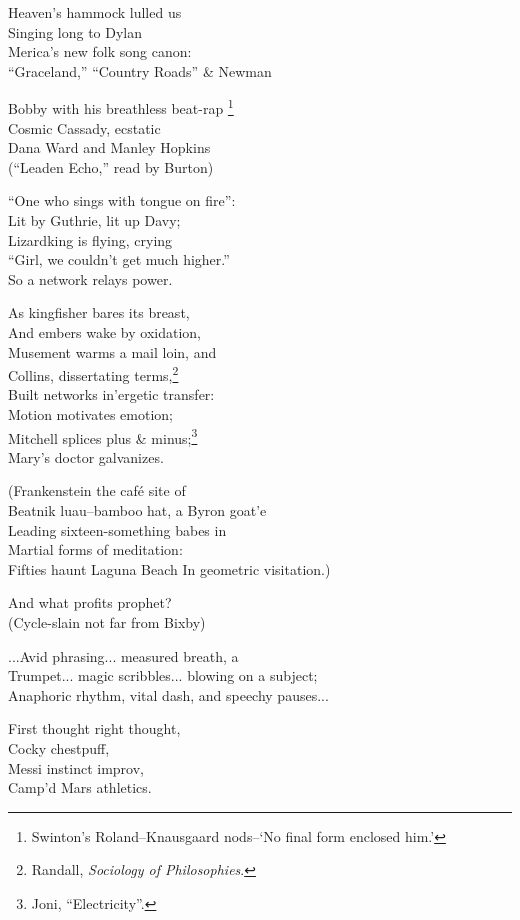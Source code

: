% 
% 
% 
% 

Heaven's hammock lulled us \\
Singing long to Dylan \\
Merica's new folk song canon: \\
``Graceland,'' ``Country Roads'' \& Newman

Bobby with his breathless beat-rap
\footnote{Swinton's Roland--Knausgaard nods--`No final form enclosed him.'} \\
Cosmic Cassady, ecstatic \\
Dana Ward and Manley Hopkins \\
(``Leaden Echo,'' read by Burton)

``One who sings with tongue on fire'': \\
Lit by Guthrie, lit up Davy;  \\
Lizardking is flying, crying \\
``Girl, we couldn't get much higher.'' \\
So a network relays power.

As kingfisher bares its breast, \\
And embers wake by oxidation, \\
Musement warms a mail loin, and \\
Collins, dissertating terms,\footnote{Randall, \textit{Sociology of Philosophies}.} \\
Built networks in'ergetic transfer: \\
Motion motivates emotion; \\
Mitchell splices plus \& minus;\footnote{Joni, ``Electricity''.} \\
Mary's doctor galvanizes.

(Frankenstein the café site of \\
Beatnik luau--bamboo hat, a Byron goat'e \\
Leading sixteen-something babes in \\
Martial forms of meditation: \\
Fifties haunt Laguna Beach
In geometric visitation.)

And what profits prophet? \\
(Cycle-slain not far from Bixby)

...Avid phrasing... measured breath, a \\
Trumpet... magic scribbles... blowing on a subject; \\
Anaphoric rhythm, vital dash, and speechy pauses...

First thought right thought, \\
Cocky chestpuff, \\
Messi instinct improv, \\
Camp'd Mars athletics.